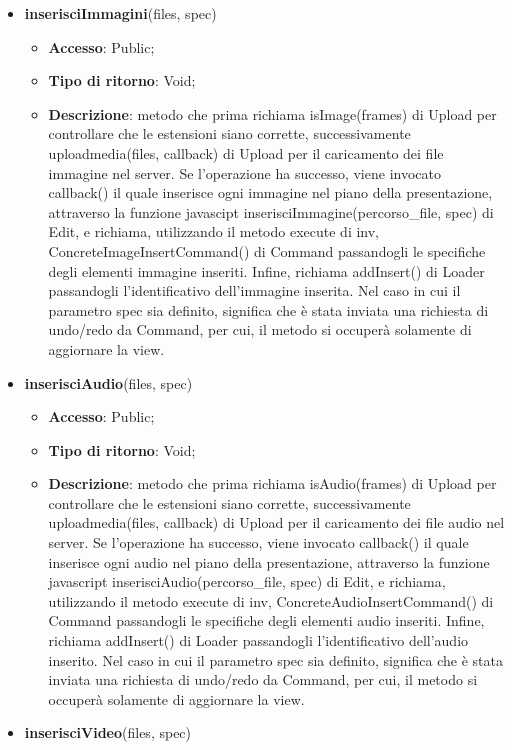 {{\begin{itemize}
\begin{itemize}
			\end{itemize}
			\item \textbf{inserisciImmagini}(files, spec)
			\begin{itemize}
				\item \textbf{Accesso}: Public;
				\item \textbf{Tipo di ritorno}: Void;
				\item \textbf{Descrizione}: metodo che prima richiama isImage(frames) di Upload per controllare che le estensioni siano corrette, successivamente uploadmedia(files, callback) di Upload per il caricamento dei file immagine nel server. Se l'operazione ha successo, viene invocato callback() il quale inserisce ogni immagine nel piano della presentazione, attraverso la funzione javascipt inserisciImmagine(percorso\_file, spec) di Edit, e richiama, utilizzando il metodo execute di inv, ConcreteImageInsertCommand() di Command passandogli le specifiche degli elementi immagine inseriti. Infine, richiama addInsert() di Loader passandogli l'identificativo dell'immagine inserita. Nel caso in cui il parametro spec sia definito, significa che è stata inviata una richiesta di undo/redo da Command, per cui, il metodo si occuperà solamente di aggiornare la view.
			\end{itemize}
			\item \textbf{inserisciAudio}(files, spec)
			\begin{itemize}
				\item \textbf{Accesso}: Public;
				\item \textbf{Tipo di ritorno}: Void;
				\item \textbf{Descrizione}: metodo che prima richiama isAudio(frames) di Upload per controllare che le estensioni siano corrette, successivamente uploadmedia(files, callback) di Upload per il caricamento dei file audio nel server. Se l'operazione ha successo, viene invocato callback() il quale inserisce ogni audio nel piano della presentazione, attraverso la funzione javascript inserisciAudio(percorso\_file, spec) di Edit, e richiama, utilizzando il metodo execute di inv, ConcreteAudioInsertCommand() di Command passandogli le specifiche degli elementi audio inseriti. Infine, richiama addInsert() di Loader passandogli l'identificativo dell'audio inserito. Nel caso in cui il parametro spec sia definito, significa che è stata inviata una richiesta di undo/redo da Command, per cui, il metodo si occuperà solamente di aggiornare la view.
			\end{itemize}
			\item \textbf{inserisciVideo}(files, spec)

\end{itemize}}}
